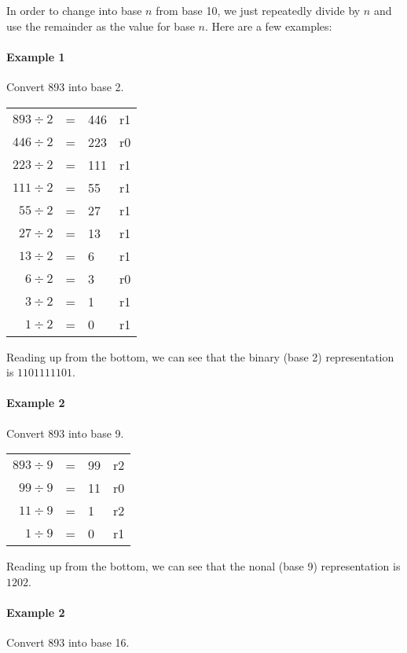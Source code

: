 \documentclass{article}
\begin{document}
In order to change into base $n$ from base 10, we just repeatedly divide by $n$ and use the remainder as the value for base $n$. Here are a few examples:

\paragraph{Example 1}
Convert 893 into base 2.

\begin{center}
	\begin{tabular} {r l l l }
		$893 \div 2$ & = & 446 & r1\\
		$446 \div 2$ & = & 223 & r0\\
		$223 \div 2$ & = & 111 & r1\\
		$111 \div 2$ & = & 55 & r1\\
		$55 \div 2$ & = & 27 & r1\\
		$27 \div 2$ & = & 13 & r1\\
		$13 \div 2$ & = & 6 & r1\\
		$6 \div 2$ & = & 3 & r0\\
		$3 \div 2$ & = & 1 & r1\\
		$1 \div 2$ & = & 0 & r1\\
	\end{tabular}
\end{center}

Reading up from the bottom, we can see that the binary (base 2) representation is $1101111101$.

\paragraph{Example 2}
Convert 893 into base 9.

\begin{center}
	\begin{tabular} {r l l l }
		$893 \div 9$ & = & 99 & r2\\
		$99 \div 9$ & = & 11 & r0\\
		$11 \div 9$ & = & 1 & r2\\
		$1 \div 9$ & = & 0 & r1\\
	\end{tabular}
\end{center}

Reading up from the bottom, we can see that the nonal (base 9) representation is $1202$.

\paragraph{Example 2}
Convert 893 into base 16.
\end{document}
